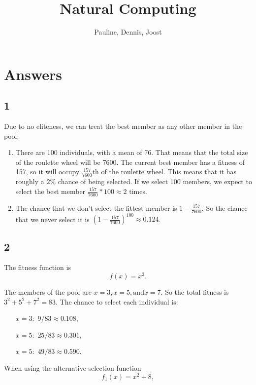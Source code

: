 \documentclass[10pt,a4paper]{article}
\title{Natural Computing}
\author{Pauline, Dennis, Joost}
\begin{document}
	\maketitle
	
	\section{Answers}
	
	\subsection*{1}
	Due to no eliteness, we can treat the best member as any other member in the pool.
	
	\begin{enumerate}[label=\alph*)]
		\item There are 100 individuals, with a mean of 76. That means that the total size of the roulette wheel will be 7600. The current best member has a fitness of 157, so it will occupy $\frac{157}{7600}$th of the roulette wheel. This means that it has roughly a $2\%$ chance of being selected. If we select 100 members, we expect to select the best member $\frac{157}{7600} * 100 \approx 2 $ times.
		
		\item The chance that we don't select the fittest member is $1 - \frac{157}{7600}$. So the chance that we never select it is $\left(1 - \frac{157}{7600}\right)^100 \approx 0.124$.
	\end{enumerate}

	\subsection*{2}
	
	The fitness function is \[ f(x) = x^2. \]
	
	The members of the pool are $x=3, x=5, \text{and} x=7$. So the total fitness is $3^2 + 5^2 + 7^2 = 83$. The chance to select each individual is: 
	\begin{itemize}
		\item[$x=3:$] $9/83 \approx 0.108$,
		
		\item[$x=5:$] $25/83 \approx 0.301$,
		
		\item[$x=5:$] $49/83 \approx 0.590$.
		 
	\end{itemize}

	When using the alternative selection function 
	\[
		f_1(x) = x^2 + 8,
	\] 
	
\end{document}
